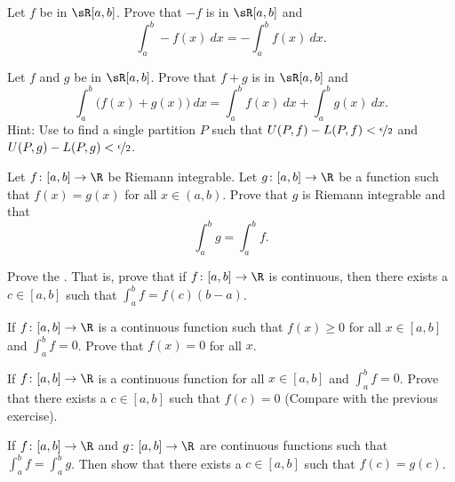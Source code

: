 \documentclass[12pt]{book}
\begin{document}
\begin{exercise}
Let $f$ be in $\sR[a,b]$.
Prove that
$-f$ is in $\sR[a,b]$ and 
\begin{equation*}
\int_a^b - f(x) ~dx = - \int_a^b f(x) ~dx .
\end{equation*}
\end{exercise}

\begin{exercise}
Let $f$ and $g$ be in $\sR[a,b]$.
Prove that $f+g$ is in $\sR[a,b]$ and
\begin{equation*}
\int_a^b \bigl( f(x)+g(x) \bigr) ~dx = 
\int_a^b f(x) ~dx 
+
\int_a^b g(x) ~dx .
\end{equation*}
Hint: Use  to find a single partition $P$
such that $U(P,f)-L(P,f) < \nicefrac{\epsilon}{2}$ and
$U(P,g)-L(P,g) < \nicefrac{\epsilon}{2}$.
\end{exercise}

\begin{exercise}
Let $f \colon [a,b] \to \R$ be Riemann integrable.
Let $g \colon [a,b] \to
\R$ be a function such that $f(x) = g(x)$ for all $x \in (a,b)$.
Prove that $g$ is Riemann integrable and that
\begin{equation*}
\int_a^b g = \int_a^b f.
\end{equation*}
\end{exercise}

\begin{exercise}
Prove the \emph{}.
That is,
prove that if $f \colon [a,b] \to \R$ is continuous, then there exists
a $c \in [a,b]$ such that $\int_a^b f = f(c)(b-a)$.
\end{exercise}

\begin{exercise}
If $f \colon [a,b] \to \R$ is a continuous function such that $f(x) \geq 0$
for all $x \in [a,b]$ and $\int_a^b f = 0$.
Prove that $f(x) = 0$
for all $x$.
\end{exercise}

\begin{exercise}
If $f \colon [a,b] \to \R$ is a continuous function
for all $x \in [a,b]$ and $\int_a^b f = 0$.
Prove that
there exists a $c \in [a,b]$ such that $f(c) = 0$ (Compare with the
previous exercise).
\end{exercise}

\begin{exercise}
If $f \colon [a,b] \to \R$ and $g \colon [a,b] \to \R$
are continuous functions such that $\int_a^b f = \int_a^b g$.
Then show that there exists a $c \in [a,b]$ such that $f(c) = g(c)$.
\end{exercise}
\end{document}
